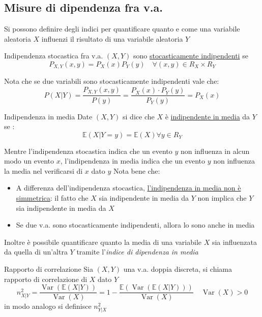 \subsection{Misure di dipendenza fra v.a.}
Si possono definire degli indici per quantificare quanto e come una variabile aleatoria $ X $ influenzi il risultato di una variabile aleatoria $ Y $
\begin{definizione}{Indipendenza stocastica fra v.a.}
	$ \left(X, Y\right) $ sono \underline{stocasticamente indipendenti} se
	\[
		P_{X, Y} \left(x,y\right) = P_{X }\left(x\right) P_{Y}\left(y\right) \quad  \forall \left(x,y\right) \in  R_X \times R_Y
	\]
\end{definizione}

Nota che se due variabili sono stocasticamente indipendenti vale che:
\[
	P\left(X|Y\right) = \frac{P_{X,Y}\left(x,y\right)}{P\left(y\right)} = \frac{P_X\left(x\right) \cdot  P_Y\left(y\right)}{P_Y\left(y\right)} = P_X\left(x\right)
\]
\begin{definizione}{Indipendenza in media}
	Date $ \left(X,Y\right) $ si dice che $ X $ è \underline{indipendente in media} da $ Y $ se :
	\[
		\mathbb{E}\left(X|Y=y\right) = \mathbb{E} \left(X\right) \forall y \in  R_Y
	\]
\end{definizione}
Mentre l'indipendenza stocastica indica che un evento $ y $ non influenza in alcun modo un evento $ x $, l'indipendenza in media indica che un evento $ y $ non influenza la media nel verificarsi di $ x $ dato $ y $
\vskip3mm
Nota bene che:
\begin{itemize}
	\item A differenza dell'indipendenza stocastica, \underline{l'indipendenza in media non è simmetrica}: il fatto che $ X $ sia indipendente in media da $ Y $ non implica che $ Y $ sia indipendente in media da $ X $
	\item Se due v.a. sono stocasticamente indipendenti, allora lo sono anche in media
\end{itemize}
Inoltre è possibile quantificare quanto la media di una variabile $ X $ sia influenzata da quella di un'altra $ Y $ tramite l'\textit{indice di dipendenza in media}
\begin{definizione}{Rapporto di correlazione}
	Sia $ \left(X, Y\right) $ una v.a. doppia discreta, si chiama rapporto di correlazione di $ X $ dato $ Y $
	\[
		n^2 _{X|Y} = \frac{\operatorname{Var} \left(\mathbb{E}\left(X|Y\right)\right)}{\operatorname{Var}\left(X\right)} = 1 - \frac{\mathbb{E}\left(\operatorname{Var} \left(\mathbb{E}\left(X|Y\right)\right)\right)}{\operatorname{Var}\left(X\right)} \quad  \operatorname{Var} \left(X\right) > 0
	\]
	in modo analogo si definisce $ n^{2}_{Y|X} $
\end{definizione}
